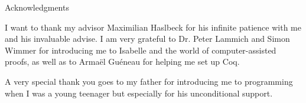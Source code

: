 \thispagestyle{empty}

\vspace*{20mm}

\begin{center}
{ Acknowledgments}
\end{center}

\vspace{10mm}

I want to thank my advisor Maximilian Haslbeck for his infinite patience with me and his invaluable advise. I am very grateful to Dr. Peter Lammich and Simon Wimmer for introducing me to Isabelle and the world of computer-assisted proofs, as well as to Armaël Guéneau for helping me set up Coq.

A very special thank you goes to my father for introducing me to programming when I was a young teenager but especially for his unconditional support.

\cleardoublepage{}

